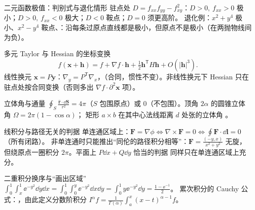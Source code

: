 \begin{结论}{二元函数极值：判别式与退化情形}
驻点处 $D=f_{xx}f_{yy}-f_{xy}^2$：$D>0,\ f_{xx}>0$ 极小；$D>0,\ f_{xx}<0$ 极大；$D<0$ 鞍点；$D=0$ 须更高阶。
退化例：$x^2+y^4$ 极小、$x^2-y^4$ 鞍点、：沿每条过原点直线都是极小，但原点不是极小（在两抛物线间为负）。
\end{结论}

\begin{结论}{多元 Taylor 与 Hessian 的坐标变换}
\[
f(\mathbf x+\mathbf h)=f+\nabla f\cdot\mathbf h+\tfrac12\mathbf h^{\mathsf T}H\mathbf h+O(|\mathbf h|^3).
\]
线性换元 $\mathbf x=P\mathbf y$：$\nabla_y=P^{\mathsf T}\nabla_x$，（合同，惯性不变）。非线性换元下 Hessian 只在驻点处按合同变换（否则多出 $\nabla f\cdot\partial^2\mathbf x$ 项）。
\end{结论}

\begin{结论}{立体角与通量}
$\oint_S\frac{\hat{\mathbf r}\cdot\dd\mathbf S}{r^2}=4\pi$（$S$ 包围原点）或 $0$（不包围）。顶角 $2\alpha$ 的圆锥立体角 $\Omega=2\pi(1-\cos\alpha)$；
矩形 $a\times b$ 在其中心法线距离 $d$ 处张的立体角 。
\end{结论}

\begin{结论}{线积分与路径无关的判据}
单连通区域上：$\mathbf F=\nabla\phi\iff\nabla\times\mathbf F=0\iff\oint\mathbf F\cdot\dd\mathbf l=0$（所有闭路）。
非单连通时只能推出“同伦的路径积分相等”：$\mathbf F=\frac{(-y,x)}{x^2+y^2}$ 无旋，但绕原点一圈积分 $2\pi$。平面上 $P\dd x+Q\dd y$ 恰当的判据  同样只在单连通区域上充分。
\end{结论}

\begin{结论}{二重积分换序与“画出区域”}
$\int_0^1\!\int_x^1\ee^{-y^2}\dd y\dd x=\int_0^1\!\int_0^y\ee^{-y^2}\dd x\dd y=\int_0^1y\ee^{-y^2}\dd y=\frac{1-\ee^{-1}}{2}$。
累次积分的 Cauchy 公式：，由此定义分数阶积分 $I^\alpha f=\frac1{\Gamma(\alpha)}\int_a^x(x-t)^{\alpha-1}f$。
\end{结论}

